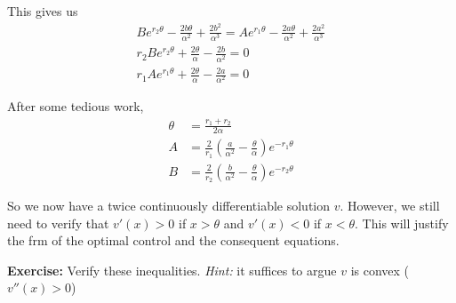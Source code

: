 \documentclass[12pt]{report}
\newenvironment*{exercise}[1][red]{
    \begin{tcolorbox}[
        parbox=false,
        colback=#1!5!white,
        colframe=#1!75!black,
        breakable
    ]}
    {\end{tcolorbox}}
\begin{document}
    This gives us 
    \begin{gather*}
        Be^{r_2 \theta} - \frac{2b\theta}{\alpha^2} + \frac{2b^2}{\alpha^3} = Ae^{r_1 \theta} - \frac{2a\theta}{\alpha^2} + \frac{2a^2}{\alpha^3}\\
        r_2Be^{r_2 \theta} + \frac{2\theta}{\alpha} - \frac{2b}{\alpha^2} = 0\\ 
        r_1Ae^{r_1 \theta} + \frac{2\theta}{\alpha} - \frac{2a}{\alpha^2} = 0
    \end{gather*}

    After some tedious work,
    \begin{align*}
        \theta &= \frac{r_1 + r_2}{2\alpha}\\ 
        A &= \frac{2}{r_1}(\frac{a}{\alpha^2} - \frac{\theta}{\alpha}) e^{-r_1\theta}\\ 
        B &= \frac{2}{r_2}(\frac{b}{\alpha^2} - \frac{\theta}{\alpha}) e^{-r_2\theta}
    \end{align*}

    So we now have a twice continuously differentiable solution $v$. However, we still need to verify that $v'(x) > 0$ if $x > \theta$ and $v'(x) < 0$ if $x < \theta$. This will justify the frm of the optimal control and the consequent equations. 

    \begin{exercise}
        \textbf{Exercise:} Verify these inequalities. \emph{Hint:} it suffices to argue $v$ is convex ($v''(x)> 0$)
    \end{exercise}
\end{document}
